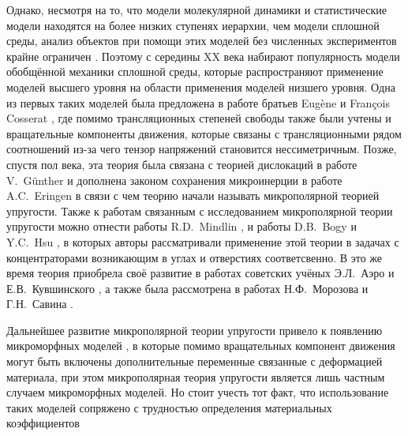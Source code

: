 Однако, несмотря на то, что модели молекулярной динамики и статистические модели находятся на более низких ступенях иерархии, чем модели сплошной среды, анализ объектов при помощи этих моделей без численных экспериментов крайне ограничен \cite{MDExperiment}. Поэтому с середины XX века набирают популярность модели обобщённой механики сплошной среды, которые распространяют применение моделей высшего уровня на области применения моделей низшего уровня. Одна из первых таких моделей была предложена в работе братьев Eugène и François Cosserat \cite{Cosserat}, где помимо трансляционных степеней свободы также были учтены и вращательные компоненты движения, которые связаны с трансляционными рядом соотношений из-за чего тензор напряжений становится нессиметричным. Позже, спустя пол века, эта теория была связана с теорией дислокаций в работе V.~G{\"u}nther \cite{CosseratAndDislocation} и дополнена законом сохранения микроинерции в работе A.C.~Eringen \cite{Eringen2, Eringen3} в связи с чем теорию начали называть микрополярной теорией упругости. Также к работам связанным с исследованием микрополярной теории упругости можно отнести работы R.D.~Mindlin \cite{Mindlin1, Mindlin2, Mindlin3}, и работы D.B.~Bogy \cite{Bogy} и Y.C.~Hsu \cite{Hsu}, в которых авторы рассматривали применение этой теории в задачах с концентраторами возникающим в углах и отверстиях соответсвенно. В это же время теория приобрела своё развитие в работах советских учёных Э.Л.~Аэро и Е.В.~Кувшинского \cite{Aero1,Aero2}, а также была рассмотрена в работах Н.Ф.~Морозова \cite{Morozov} и Г.Н.~Савина \cite{Savin}.

Дальнейшее развитие микрополярной теории упругости привело к появлению микроморфных моделей \cite{Eringen4, Micromorph1, Micromorph2}, в которые помимо вращательных компонент движения могут быть включены дополнительные переменные связанные с деформацией материала, при этом микрополярная теория упругости является лишь частным случаем микроморфных моделей. Но стоит учесть тот факт, что использование таких моделей сопряжено с трудностью определения материальных коэффициентов

